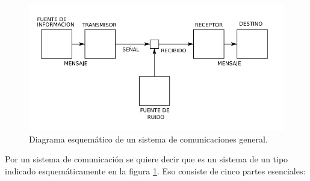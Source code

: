 \begin{figure}[!ht]
\centerline{\includegraphics[width=120mm]{fig1shannon_esp.pdf}}
\caption{Diagrama esquem\'{a}tico de un sistema de comunicaciones
  general.}
\label{fig:1}
\end{figure}

Por un sistema de comunicaci\'{o}n se quiere decir que es un sistema
de un tipo indicado esquem\'{a}ticamente en la figura \ref{fig:1}. Eso
consiste de cinco partes esenciales:

